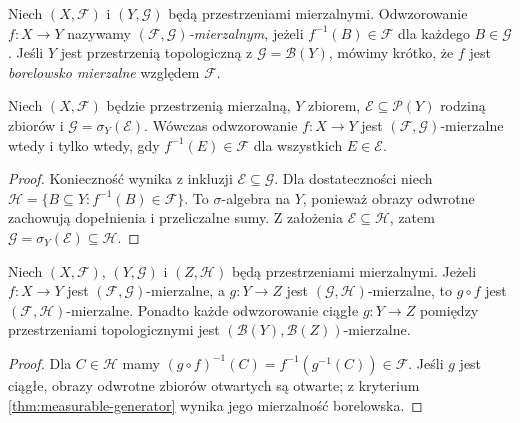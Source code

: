 \begin{definicja}
\label{def:measurable-map}
Niech $(X,\mathcal F)$ i $(Y,\mathcal G)$ będą przestrzeniami
mierzalnymi. Odwzorowanie $f:X\to Y$ nazywamy
\emph{$(\mathcal F,\mathcal G)$-mierzalnym}, jeżeli
$f^{-1}(B)\in\mathcal F$ dla każdego $B\in\mathcal G$.
Jeśli $Y$ jest przestrzenią topologiczną z
$\mathcal G=\mathcal B(Y)$, mówimy krótko, że $f$ jest
\emph{borelowsko mierzalne} względem $\mathcal F$.
\end{definicja}

\begin{twierdzenie}
\label{thm:measurable-generator}
Niech $(X,\mathcal F)$ będzie przestrzenią mierzalną, $Y$ zbiorem,
$\mathcal E\subseteq\mathcal P(Y)$ rodziną zbiorów i
$\mathcal G=\sigma_Y(\mathcal E)$. Wówczas odwzorowanie
$f:X\to Y$ jest $(\mathcal F,\mathcal G)$-mierzalne wtedy i tylko
wtedy, gdy $f^{-1}(E)\in\mathcal F$ dla wszystkich $E\in\mathcal E$.
\end{twierdzenie}
\begin{proof}
Konieczność wynika z inkluzji $\mathcal E\subseteq\mathcal G$.
Dla dostateczności niech
$\mathcal H=\{B\subseteq Y:f^{-1}(B)\in\mathcal F\}$.
To $\sigma$-algebra na $Y$, ponieważ obrazy odwrotne zachowują
dopełnienia i przeliczalne sumy. Z założenia
$\mathcal E\subseteq\mathcal H$, zatem
$\mathcal G=\sigma_Y(\mathcal E)\subseteq\mathcal H$.
\end{proof}

\begin{twierdzenie}
\label{thm:composition-measurable}
Niech $(X,\mathcal F)$, $(Y,\mathcal G)$ i $(Z,\mathcal H)$
będą przestrzeniami mierzalnymi. Jeżeli $f:X\to Y$ jest
$(\mathcal F,\mathcal G)$-mierzalne, a $g:Y\to Z$ jest
$(\mathcal G,\mathcal H)$-mierzalne, to $g\circ f$ jest
$(\mathcal F,\mathcal H)$-mierzalne.
Ponadto każde odwzorowanie ciągłe $g:Y\to Z$ pomiędzy
przestrzeniami topologicznymi jest
$(\mathcal B(Y),\mathcal B(Z))$-mierzalne.
\end{twierdzenie}
\begin{proof}
Dla $C\in\mathcal H$ mamy
$(g\circ f)^{-1}(C)=f^{-1}(g^{-1}(C))\in\mathcal F$.
Jeśli $g$ jest ciągłe, obrazy odwrotne zbiorów otwartych są otwarte;
z kryterium \ref{thm:measurable-generator} wynika jego mierzalność
borelowska.
\end{proof}

